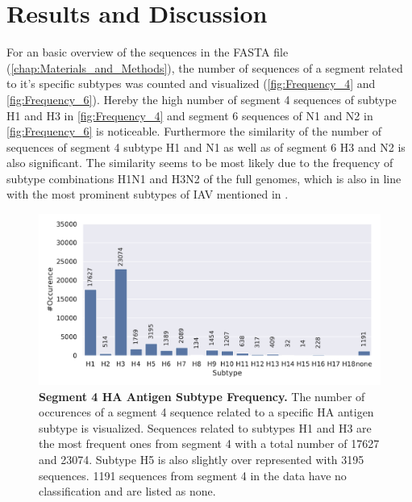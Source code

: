 \chapter{Results and Discussion} \label{chap:Results_and_Discussion}

For an basic overview of the sequences in the FASTA file (\autoref{chap:Materials_and_Methods}), the number of sequences of a segment related to it's specific subtypes was counted and visualized (\autoref{fig:Frequency_4} and \autoref{fig:Frequency_6}). Hereby the high number of segment 4 sequences of subtype H1 and H3 in \autoref{fig:Frequency_4} and segment 6 sequences of N1 and N2 in \autoref{fig:Frequency_6} is noticeable. Furthermore the similarity of the number of sequences of segment 4 subtype H1 and N1 as well as of segment 6 H3 and N2 is also significant. The similarity seems to be most likely due to the frequency of subtype combinations H1N1 and H3N2 of the full genomes, which is also in line with the most prominent subtypes of \gls{IAV} mentioned in \textcite{deng_simplified_2015}. 

\begin{figure}[!hbt]
    \centering
    \includegraphics[width=\textwidth]{PCA/Data_Overview_Segment_4_H.pdf}
    \caption[Segment 4 \Acrlong{HA} Antigen Subtype Frequency]{\textbf{Segment 4 \Acrlong{HA} Antigen Subtype Frequency.} The number of occurences of a segment 4 sequence related to a specific \gls{HA} antigen subtype is visualized. Sequences related to subtypes H1 and H3 are the most frequent ones from segment 4 with a total number of 17627 and 23074. Subtype H5 is also slightly over represented with 3195 sequences. 1191 sequences from segment 4 in the data have no classification and are listed as \glqq none\grqq{}.}
    \label{fig:Frequency_4}
\end{figure}

